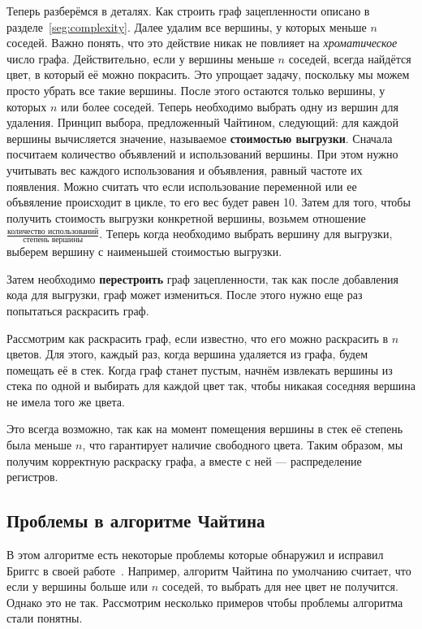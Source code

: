Теперь разберёмся в деталях. Как строить граф зацепленности описано в разделе~\ref{seg:complexity}. Далее удалим все вершины, у
которых меньше $n$ соседей. Важно понять, что это действие никак не повлияет на \textit{хроматическое} число графа. Действительно,
если у вершины меньше $n$ соседей, всегда найдётся цвет, в который её можно покрасить.
 Это упрощает задачу, поскольку мы можем просто убрать все такие вершины.
После этого остаются только вершины, у которых $n$ или более соседей. Теперь необходимо выбрать одну из вершин для удаления. Принцип выбора,
предложенный Чайтином, следующий: для каждой вершины вычисляется значение, называемое \textbf{стоимостью выгрузки}. Сначала посчитаем количество
объявлений и использований вершины. При этом нужно учитывать вес каждого использования и объявления, равный частоте их появления.
Можно считать что если использование переменной или ее объвяление происходит в цикле, то его вес будет равен 10.
Затем для того, чтобы получить стоимость выгрузки конкретной вершины, возьмем отношение
$\frac{\textit{количество использований}}{\textit{степень вершины}}$. Теперь когда необходимо выбрать вершину для выгрузки,
выберем вершину с наименьшей стоимостью выгрузки.

Затем необходимо \textbf{перестроить} граф зацепленности, так как после добавления кода для выгрузки, граф может измениться. После этого нужно
еще раз попытаться раскрасить граф.

Рассмотрим как раскрасить граф, если известно, что его можно раскрасить в $n$ цветов. Для этого, каждый раз, когда вершина
удаляется из графа, будем помещать её в стек. Когда граф станет пустым, начнём извлекать вершины из стека по одной и выбирать
для каждой цвет так, чтобы никакая соседняя вершина не имела того же цвета. 

Это всегда возможно, так как на момент помещения вершины в стек её степень была меньше $n$, что гарантирует наличие свободного
цвета. Таким образом, мы получим корректную раскраску графа, а вместе с ней — распределение регистров.

\subsection{Проблемы в алгоритме Чайтина}

В этом алгоритме есть некоторые проблемы которые обнаружил и исправил Бриггс в своей работе~\cite{briggs1994}.
Например, алгоритм Чайтина по умолчанию считает, что если у вершины больше или $n$ соседей,
то выбрать для нее цвет не получится.
Однако это не так. 
Рассмотрим несколько примеров чтобы проблемы алгоритма стали понятны.

